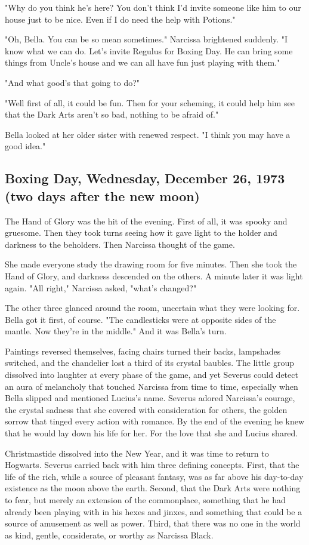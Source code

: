 "Why do you think he's here? You don't think I'd invite someone like him to our house just to be nice. Even if I do need the help with Potions."

"Oh, Bella. You can be so mean sometimes." Narcissa brightened suddenly. "I know what we can do. Let's invite Regulus for Boxing Day. He can bring some things from Uncle's house and we can all have fun just playing with them."

"And what good's that going to do?"

"Well first of all, it could be fun. Then for your scheming, it could help him see that the Dark Arts aren't so bad, nothing to be afraid of."

Bella looked at her older sister with renewed respect. "I think you may have a good idea."

\subsection{Boxing Day, Wednesday, December 26, 1973 (two days after the new moon)}

The Hand of Glory was the hit of the evening. First of all, it was spooky and gruesome. Then they took turns seeing how it gave light to the holder and darkness to the beholders. Then Narcissa thought of the game.

She made everyone study the drawing room for five minutes. Then she took the Hand of Glory, and darkness descended on the others. A minute later it was light again. "All right," Narcissa asked, "what's changed?"

The other three glanced around the room, uncertain what they were looking for. Bella got it first, of course. "The candlesticks were at opposite sides of the mantle. Now they're in the middle." And it was Bella's turn.

Paintings reversed themselves, facing chairs turned their backs, lampshades switched, and the chandelier lost a third of its crystal baubles. The little group dissolved into laughter at every phase of the game, and yet Severus could detect an aura of melancholy that touched Narcissa from time to time, especially when Bella slipped and mentioned Lucius's name. Severus adored Narcissa's courage, the crystal sadness that she covered with consideration for others, the golden sorrow that tinged every action with romance. By the end of the evening he knew that he would lay down his life for her. For the love that she and Lucius shared.

Christmastide dissolved into the New Year, and it was time to return to Hogwarts. Severus carried back with him three defining concepts. First, that the life of the rich, while a source of pleasant fantasy, was as far above his day-to-day existence as the moon above the earth. Second, that the Dark Arts were nothing to fear, but merely an extension of the commonplace, something that he had already been playing with in his hexes and jinxes, and something that could be a source of amusement as well as power. Third, that there was no one in the world as kind, gentle, considerate, or worthy as Narcissa Black.

